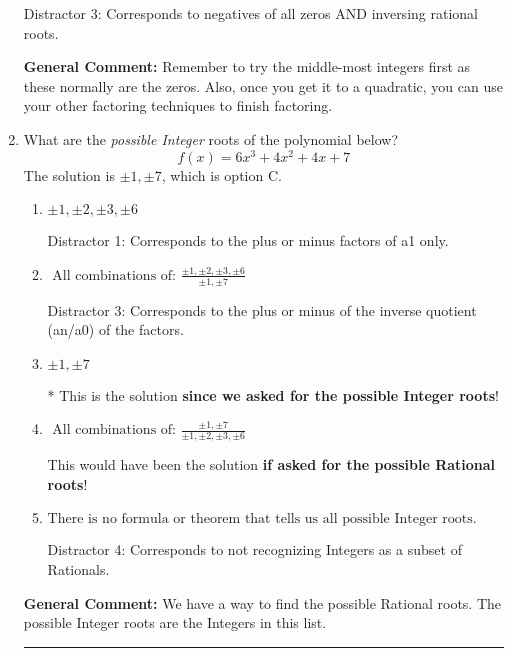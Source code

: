 \documentclass{extbook}[14pt]
\newcommand{\litem}[1]{\item #1

\rule{\textwidth}{0.4pt}}
\begin{document}
\begin{enumerate}
{\begin{enumerate}[label=\Alph*.]
 Distractor 3: Corresponds to negatives of all zeros AND inversing rational roots.
\end{enumerate}

\textbf{General Comment:} Remember to try the middle-most integers first as these normally are the zeros. Also, once you get it to a quadratic, you can use your other factoring techniques to finish factoring.
}
\litem{
What are the \textit{possible Integer} roots of the polynomial below?
\[ f(x) = 6x^{3} +4 x^{2} +4 x + 7 \]The solution is \( \pm 1,\pm 7 \), which is option C.\begin{enumerate}[label=\Alph*.]
\item \( \pm 1,\pm 2,\pm 3,\pm 6 \)

 Distractor 1: Corresponds to the plus or minus factors of a1 only.
\item \( \text{ All combinations of: }\frac{\pm 1,\pm 2,\pm 3,\pm 6}{\pm 1,\pm 7} \)

 Distractor 3: Corresponds to the plus or minus of the inverse quotient (an/a0) of the factors. 
\item \( \pm 1,\pm 7 \)

* This is the solution \textbf{since we asked for the possible Integer roots}!
\item \( \text{ All combinations of: }\frac{\pm 1,\pm 7}{\pm 1,\pm 2,\pm 3,\pm 6} \)

This would have been the solution \textbf{if asked for the possible Rational roots}!
\item \( \text{There is no formula or theorem that tells us all possible Integer roots.} \)

 Distractor 4: Corresponds to not recognizing Integers as a subset of Rationals.
\end{enumerate}

\textbf{General Comment:} We have a way to find the possible Rational roots. The possible Integer roots are the Integers in this list.
}
\end{enumerate}
\end{document}

